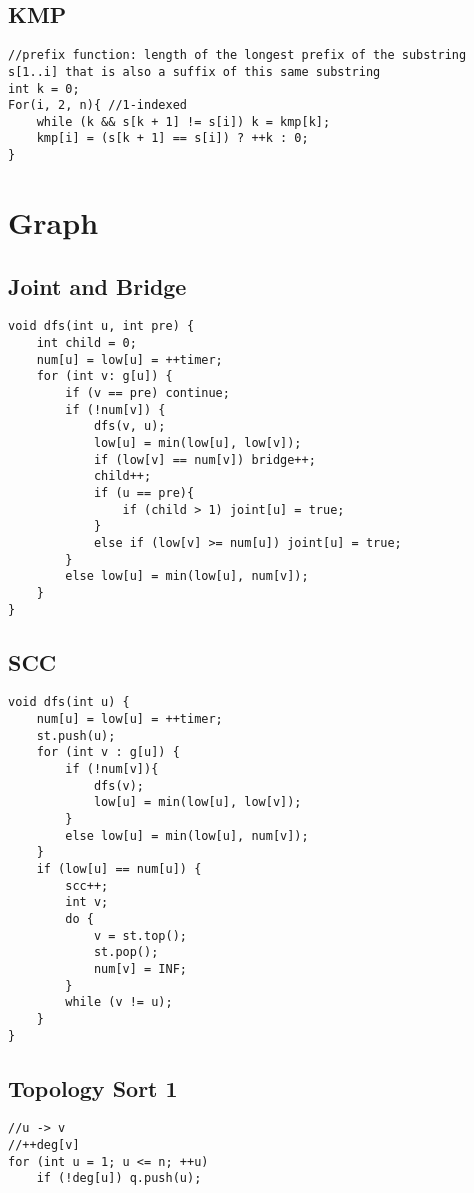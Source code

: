 \documentclass[11pt,a4paper]{article}
\begin{document}
\begin{multicols*}{2}
\subsection{KMP}
\begin{lstlisting}
//prefix function: length of the longest prefix of the substring s[1..i] that is also a suffix of this same substring
int k = 0;
For(i, 2, n){ //1-indexed
    while (k && s[k + 1] != s[i]) k = kmp[k];
    kmp[i] = (s[k + 1] == s[i]) ? ++k : 0;
}
\end{lstlisting}

\section{Graph}
\subsection{Joint and Bridge}
\begin{lstlisting}
void dfs(int u, int pre) {
    int child = 0; 
    num[u] = low[u] = ++timer;
    for (int v: g[u]) {
        if (v == pre) continue;
        if (!num[v]) {
            dfs(v, u);
            low[u] = min(low[u], low[v]);
            if (low[v] == num[v]) bridge++;
            child++;
            if (u == pre){
                if (child > 1) joint[u] = true;
            }
            else if (low[v] >= num[u]) joint[u] = true;
        }
        else low[u] = min(low[u], num[v]);
    }
}
\end{lstlisting}

\subsection{SCC}
\begin{lstlisting}
void dfs(int u) {
    num[u] = low[u] = ++timer;
    st.push(u);
    for (int v : g[u]) {
        if (!num[v]){
            dfs(v);
            low[u] = min(low[u], low[v]);
        }
        else low[u] = min(low[u], num[v]);
    }
    if (low[u] == num[u]) {
        scc++;
        int v;
        do {
            v = st.top();
            st.pop();
            num[v] = INF;
        }
        while (v != u);
    }
}
\end{lstlisting}

\subsection{Topology Sort 1}
\begin{lstlisting}
//u -> v
//++deg[v]
for (int u = 1; u <= n; ++u)
    if (!deg[u]) q.push(u);


\end{lstlisting}
\end{multicols*}
\end{document}
